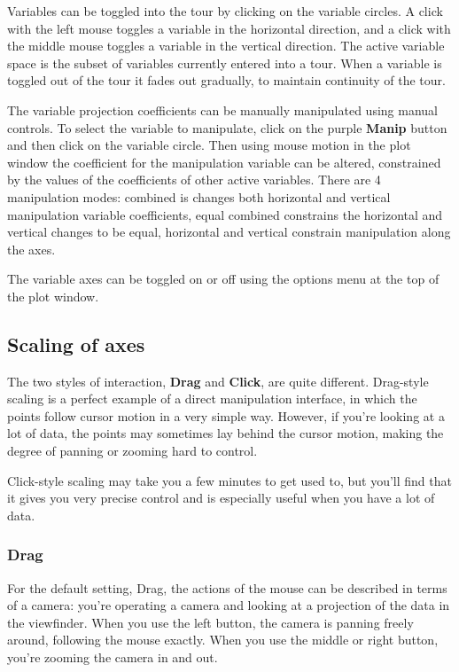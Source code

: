 \documentclass[11pt]{article}
\begin{document}
Variables can be toggled into the tour by clicking on the variable
circles. A click with the left mouse toggles a variable in the
horizontal direction, and a click with the middle mouse toggles a
variable in the vertical direction. The active variable space is the
subset of variables currently entered into a tour. When a variable is
toggled out of the tour it fades out gradually, to maintain continuity
of the tour.

The variable projection coefficients can be manually manipulated using
manual controls. To select the variable to manipulate, click on the
purple {\bf Manip} button and then click on the variable circle. Then
using mouse motion in the plot window the coefficient for the
manipulation variable can be altered, constrained by the values of the
coefficients of other active variables. There are 4 manipulation
modes: combined is changes both horizontal and vertical manipulation
variable coefficients, equal combined constrains the horizontal and
vertical changes to be equal, horizontal and vertical constrain
manipulation along the axes.

The variable axes can be toggled on or off using the options menu at
the top of the plot window.

\subsection{Scaling of axes}
\label{slbl:Scaling}

The two styles of interaction, {\bf Drag} and {\bf Click}, are quite
different.  Drag-style scaling is a perfect example of a direct
manipulation interface, in which the points follow cursor motion in a
very simple way.  However, if you're looking at a lot of data, the
points may sometimes lay behind the cursor motion, making the degree
of panning or zooming hard to control.

Click-style scaling may take you a few minutes to get used to, but
you'll find that it gives you very precise control and is especially
useful when you have a lot of data.

\subsubsection{Drag}

For the default setting, Drag, the actions of the mouse can be
described in terms of a camera:  you're operating a camera and
looking at a projection of the data in the viewfinder.  When you use
the left button, the camera is panning freely around, following the
mouse exactly.  When you use the middle or right button, you're
zooming the camera in and out.
\end{document}
